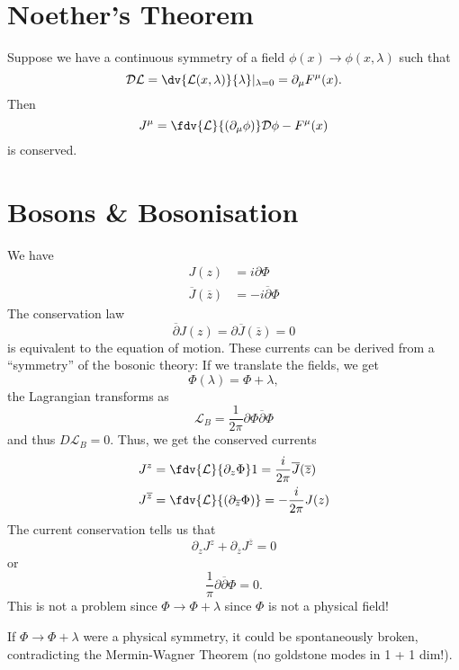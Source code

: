 \documentclass[twoside,symmetric, openany, 12pt]{./tuftebook}
\theoremstyle{definition}
\theoremstyle{definition}
\theoremstyle{definition}
\begin{document}
\section{Noether's Theorem}
Suppose we have a continuous symmetry of a field $\phi(x) \to \phi(x, \lambda)$ such that
\[
	\mathcal{D}\mathcal{L}= \dv{\mathcal{L}(x, \lambda)}{\lambda}|_{\lambda=0}=\partial_\mu F^\mu(x)
.\] 
Then
\[
	J^\mu = \fdv{\mathcal{L}}{(\partial_\mu \phi)} \mathcal{D}\phi - F^\mu(x)
\]
is conserved.
\section{Bosons \& Bosonisation}
We have
\begin{align*}
	J(z) &= i\partial \Phi\\
	\overline{J}(\overline{z})&=-i \overline{\partial}\Phi
\end{align*}
The conservation law
\[
\overline{\partial}J(z)=\partial \overline{J}(\overline{z})=0
\]
is equivalent to the equation of motion. These currents can be derived from a ``symmetry'' of the bosonic theory: If we translate the fields, we get
\[
\Phi(\lambda)=\Phi+\lambda
,\]
the Lagrangian transforms as
\[
\mathcal{L}_B = \frac{1}{2\pi}\partial \Phi \overline{\partial}\Phi
\]
and thus $D\mathcal{L}_B=0$. Thus, we get the conserved currents
\begin{align*}
	J^z &= \fdv{\mathcal{L}}{\partial_z \Phi} 1 = \frac{i}{2\pi}\overline{J}(\overline{z}) \\
	J^{\overline{z}} &= \fdv{\mathcal{L}}{(\partial_{\overline{z}}\Phi)} = -\frac{i}{2\pi}J(z)
\end{align*}
The current conservation tells us that
\[
	\partial_z J^z + \partial_{\overline{z}} J^{\overline{z}} = 0
\]
or
\[
\frac{1}{\pi}\partial \overline{\partial}\Phi=0
.\] 
This is not a problem since $\Phi\to \Phi+\lambda$ since $\Phi$ is not a physical field! 

If $\Phi \to \Phi+\lambda$ were a physical symmetry, it could be spontaneously broken, contradicting the Mermin-Wagner Theorem (no goldstone modes in 1 + 1 dim!).
\end{document}
